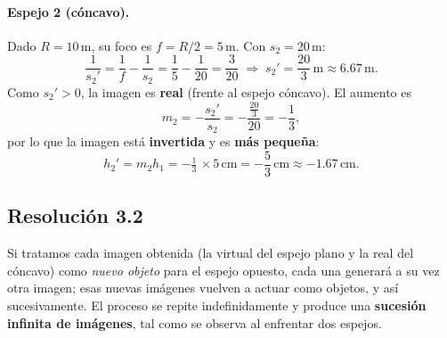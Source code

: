 \documentclass[
  11pt,
  letterpaper,
   addpoints,
   answers
  ]{exam}
\begin{document}
\begin{questions}
\begin{solution}
\paragraph{Espejo 2 (cóncavo).} Dado $R=10\,\text{m}$, su foco es $f=R/2=5\,\text{m}$. Con $s_2=20\,\text{m}$:
\[
\frac{1}{s_2'}=\frac{1}{f}-\frac{1}{s_2}=\frac{1}{5}-\frac{1}{20}=\frac{3}{20}
\;\Rightarrow\; s_2'=\frac{20}{3}\,\text{m}\approx6.67\,\text{m}.
\]
Como $s_2'>0$, la imagen es \textbf{real} (frente al espejo cóncavo). El aumento es
\[
m_2=-\frac{s_2'}{s_2}=-\frac{\tfrac{20}{3}}{20}=-\frac{1}{3},
\]
por lo que la imagen está \textbf{invertida} y es \textbf{más pequeña}:
\[
h_2'=m_2h_1=-\tfrac{1}{3}\,\times 5\,\text{cm}=-\frac{5}{3}\,\text{cm}\approx-1.67\,\text{cm}.
\]

\subsection*{Resolución 3.2}
Si tratamos cada imagen obtenida (la virtual del espejo plano y la real del cóncavo) como \emph{nuevo objeto} para el espejo opuesto, cada una generará a su vez otra imagen; esas nuevas imágenes vuelven a actuar como objetos, y así sucesivamente. El proceso se repite indefinidamente y produce una \textbf{sucesión infinita de imágenes}, tal como se observa al enfrentar dos espejos.
\end{solution}
\end{questions}
\end{document}
